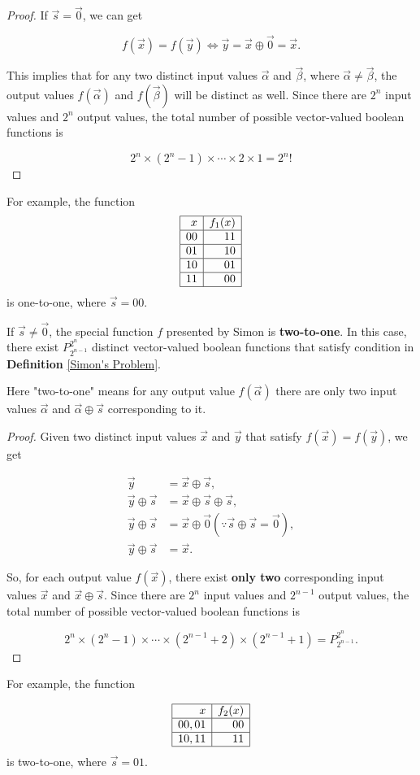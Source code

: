\begin{proof}
If $\vec{s} = \vec{0}$, we can get

$$
f(\vec{x})=f(\vec{y}) \iff \vec{y}=\vec{x}\oplus \vec{0} = \vec{x}.
$$

This implies that for any two distinct input values $\vec{\alpha}$ and $\vec{\beta}$, where $\vec{\alpha} \neq \vec{\beta}$, the output values $f(\vec{\alpha})$ and $f(\vec{\beta})$ will be distinct as well. Since there are $2^n$ input values and $2^n$ output values, the total number of possible vector-valued boolean functions is

$$
2^n \times (2^n-1) \times \cdots \times 2 \times 1 = 2^n!
$$
\end{proof}
For example, the function 
$$
\begin{array}{|r|r|}
	\hline x & f_1(x) \\
	\hline 00 & 11 \\
	\hline 01 & 10 \\
	\hline 10 & 01 \\
	\hline 11 & 00 \\
	\hline
\end{array}
$$
is one-to-one, where $\vec{s}=00$.

\begin{property}
If $\vec{s} \neq \vec{0}$, the special function $f$ presented by Simon is \textbf{two-to-one}. In this case, there exist $P^{2^n}_{2^{n-1}}$ distinct vector-valued boolean functions that satisfy condition in \textbf{Definition} \ref{Simon's Problem}.
\end{property}

\begin{mdframed}
Here "two-to-one" means for any output value $f(\vec{\alpha})$ there are only two input values $\vec{\alpha}$ and $\vec{\alpha} \oplus \vec{s}$ corresponding to it.
\end{mdframed}

\begin{proof}
Given two distinct input values $\vec{x}$ and $\vec{y}$ that satisfy $f(\vec{x}) = f(\vec{y})$, we get

$$
\begin{aligned}
	\vec{y} & = \vec{x} \oplus \vec{s}, \\
	\vec{y} \oplus \vec{s} & = \vec{x} \oplus \vec{s} \oplus \vec{s}, \\
	\vec{y} \oplus \vec{s} & = \vec{x} \oplus \vec{0} (\because \vec{s} \oplus \vec{s} = \vec{0}), \\
	\vec{y} \oplus \vec{s} & = \vec{x}.
\end{aligned}
$$

So, for each output value $f(\vec{x})$, there exist \textbf{only two} corresponding input values $\vec{x}$ and $\vec{x} \oplus \vec{s}$. Since there are $2^n$ input values and $2^{n-1}$ output values, the total number of possible vector-valued boolean functions is

$$
2^n \times (2^n-1) \times \cdots \times (2^{n-1}+2) \times (2^{n-1}+1) = P^{2^n}_{2^{n-1}}.
$$
\end{proof}
For example, the function 

$$
\begin{array}{|r|r|}
	\hline x & f_2(x) \\
	\hline 00,01 & 00 \\
	\hline 10,11 & 11 \\
	\hline
\end{array}
$$
is two-to-one, where $\vec{s}=01$.